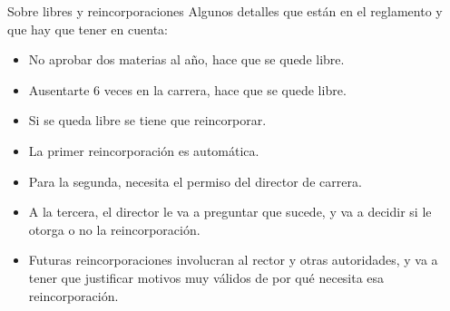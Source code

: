 

\begin{frame}{Sobre libres y reincorporaciones}
  Algunos detalles que están en el reglamento y que hay que tener en cuenta:
  \begin{itemize}
    \item No aprobar dos materias al año, hace que se quede libre.
    \item Ausentarte 6 veces en la carrera, hace que se quede libre.
    \item Si se queda libre se tiene que reincorporar.
    \item La primer reincorporación es automática.
    \item Para la segunda, necesita el permiso del director de carrera.
    \item A la tercera, el director le va a preguntar que sucede, y va a decidir
      si le otorga o no la reincorporación.
    \item Futuras reincorporaciones involucran al rector y otras autoridades, y
      va a tener que justificar motivos muy válidos de por qué necesita esa
      reincorporación.
  \end{itemize}  
  \\
  \centerline{}
\end{frame}


